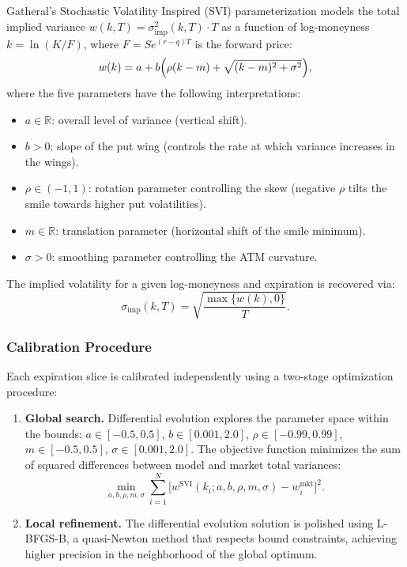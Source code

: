 \documentclass[11pt,a4paper]{article}
\begin{document}
Gatheral's Stochastic Volatility Inspired (SVI) parameterization \citep{gatheral2014arbitrage} models the total implied variance $w(k, T) = \sigma^2_{\text{imp}}(k, T) \cdot T$ as a function of log-moneyness $k = \ln(K/F)$, where $F = S e^{(r-q)T}$ is the forward price:
\begin{equation}\label{eq:svi}
    w(k) = a + b \Bigl( \rho(k - m) + \sqrt{(k - m)^2 + \sigma^2} \Bigr),
\end{equation}
where the five parameters have the following interpretations:
\begin{itemize}[nosep]
    \item $a \in \mathbb{R}$: overall level of variance (vertical shift).
    \item $b > 0$: slope of the put wing (controls the rate at which variance increases in the wings).
    \item $\rho \in (-1, 1)$: rotation parameter controlling the skew (negative $\rho$ tilts the smile towards higher put volatilities).
    \item $m \in \mathbb{R}$: translation parameter (horizontal shift of the smile minimum).
    \item $\sigma > 0$: smoothing parameter controlling the ATM curvature.
\end{itemize}

The implied volatility for a given log-moneyness and expiration is recovered via:
\begin{equation}
    \sigma_{\text{imp}}(k, T) = \sqrt{\frac{\max\{w(k), 0\}}{T}}.
\end{equation}

\subsubsection{Calibration Procedure}

Each expiration slice is calibrated independently using a two-stage optimization procedure:

\begin{enumerate}
    \item \textbf{Global search.} Differential evolution \citep{zeliade2009quasi} explores the parameter space within the bounds: $a \in [-0.5, 0.5]$, $b \in [0.001, 2.0]$, $\rho \in [-0.99, 0.99]$, $m \in [-0.5, 0.5]$, $\sigma \in [0.001, 2.0]$. The objective function minimizes the sum of squared differences between model and market total variances:
    \begin{equation}\label{eq:svi_objective}
        \min_{a, b, \rho, m, \sigma} \sum_{i=1}^{N} \bigl[ w^{\text{SVI}}(k_i; a, b, \rho, m, \sigma) - w_i^{\text{mkt}} \bigr]^2.
    \end{equation}

    \item \textbf{Local refinement.} The differential evolution solution is polished using L-BFGS-B, a quasi-Newton method that respects bound constraints, achieving higher precision in the neighborhood of the global optimum.
\end{enumerate}
\end{document}
